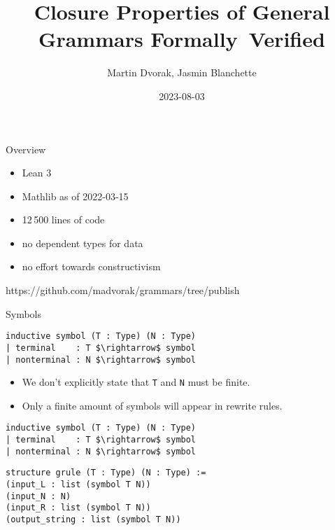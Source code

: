 \documentclass{beamer}
\title{Closure Properties of General Grammars Formally~Verified}
\author{Martin Dvorak, Jasmin Blanchette}
\date{2023-08-03}
\begin{document}
	
	\begin{frame}[plain]
		\maketitle
	\end{frame}
	
	\begin{frame}{Overview}
		\bigskip \bigskip
		\bigskip \bigskip
		\begin{itemize}
			\item Lean 3
			\item Mathlib as of 2022-03-15
			\item 12\,500 lines of code
			\item no dependent types for data
			\item no effort towards constructivism
		\end{itemize}
		\bigskip \bigskip
		\bigskip \bigskip
		\bigskip \bigskip
		
		https://github.com/madvorak/grammars/tree/publish
	\end{frame}
	
	\begin{frame}[fragile]{Symbols}
\begin{lstlisting}
inductive symbol (T : Type) (N : Type)
| terminal    : T $\rightarrow$ symbol
| nonterminal : N $\rightarrow$ symbol
\end{lstlisting}
		\bigskip
		\pause
		\begin{itemize}
			\item We don't explicitly state that \texttt{T} and \texttt{N} must be finite.
			\item Only a finite amount of symbols will appear in rewrite rules.
		\end{itemize}
	\end{frame}

	\begin{frame}[fragile]{\only<2->{Rules}}
\begin{lstlisting}
inductive symbol (T : Type) (N : Type)
| terminal    : T $\rightarrow$ symbol
| nonterminal : N $\rightarrow$ symbol
\end{lstlisting}
\pause
\begin{lstlisting}
structure grule (T : Type) (N : Type) :=
(input_L : list (symbol T N))
(input_N : N)
(input_R : list (symbol T N))
(output_string : list (symbol T N))
\end{lstlisting}
	\end{frame}
	
\end{document}
